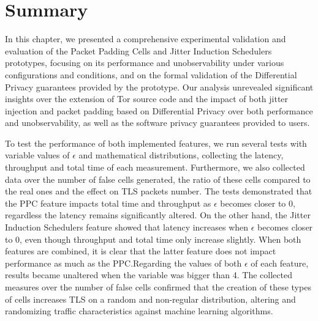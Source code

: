 \section{Summary}\label{sec:validation_summary} %

In this chapter, we presented a comprehensive experimental validation and evaluation of the Packet Padding Cells and Jitter Induction Schedulers prototypes, focusing on its performance and unobservability under various configurations and conditions, and on the formal validation of the Differential Privacy guarantees provided by the prototype. Our analysis unrevealed significant insights over the extension of Tor source code and the impact of both jitter injection and packet padding based on Differential Privacy over both performance and unobservability, as well as the software privacy guarantees provided to users. 

To test the performance of both implemented features, we run several tests with variable values of $\epsilon$ and mathematical distributions, collecting the latency, throughput and total time of each measurement. Furthermore, we also collected data over the number of false cells generated, the ratio of these cells compared to the real ones and the effect on TLS packets number.
The tests demonstrated that the PPC feature impacts total time and throughput as $\epsilon$ becomes closer to 0, regardless the latency remains significantly altered. On the other hand, the Jitter Induction Schedulers feature showed that latency increases when $\epsilon$ becomes closer to 0, even though throughput and total time only increase slightly. When both features are combined, it is clear that the latter feature does not impact performance as much as the PPC.\@ Regarding the values of both $\epsilon$ of each feature, results became unaltered when the variable was bigger than 4.
The collected measures over the number of false cells confirmed that the creation of these types of cells increases TLS on a random and non-regular distribution, altering and randomizing traffic characteristics against machine learning algorithms.

